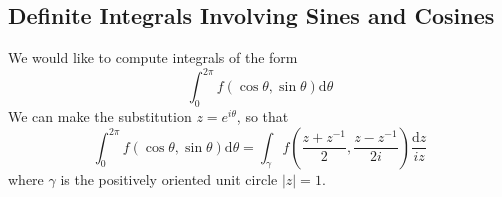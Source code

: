 \documentclass[12pt]{article}
\newcommand{\diff}{\mathrm{d}}
\theoremstyle{definition}
\begin{document}
\subsection{Definite Integrals Involving Sines and Cosines}
We would like to compute integrals of the form
\[
\int_0^{2\pi} f(\cos\theta, \sin\theta)\diff \theta
\]
We can make the substitution $z=e^{i\theta}$, so that
\[
\int_0^{2\pi}f(\cos\theta, \sin\theta)\diff \theta = \int_\gamma f(\frac{z + z^{-1}}{2}, \frac{z-z^{-1}}{2i})\frac{\diff z}{iz}
\]
where $\gamma$ is the positively oriented unit circle $|z|=1$.
\end{document}
